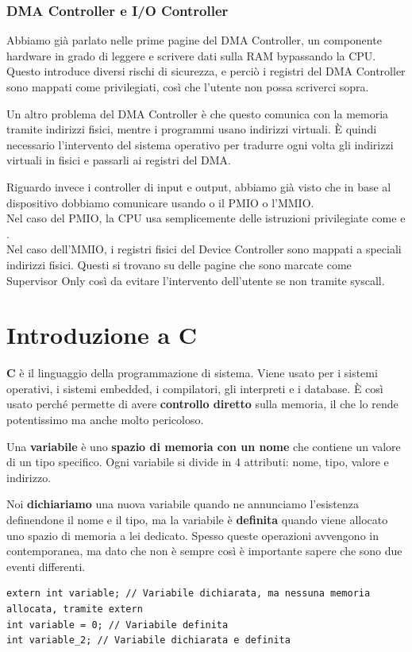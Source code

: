 \documentclass[11pt, a4paper, titlepage, oneside]{scrbook}
\begin{document}
\subsubsection*{DMA Controller e I/O Controller}

Abbiamo già parlato nelle prime pagine del DMA Controller, un componente hardware in grado di leggere e scrivere dati sulla RAM bypassando la CPU. Questo introduce diversi rischi di sicurezza, e perciò i registri del DMA Controller sono mappati come privilegiati, così che l'utente non possa scriverci sopra. 

Un altro problema del DMA Controller è che questo comunica con la memoria tramite indirizzi fisici, mentre i programmi usano indirizzi virtuali. È quindi necessario l'intervento del sistema operativo per tradurre ogni volta gli indirizzi virtuali in fisici e passarli ai registri del DMA.

Riguardo invece i controller di input e output, abbiamo già visto che in base al dispositivo dobbiamo comunicare usando o il PMIO o l'MMIO. \\
Nel caso del PMIO, la CPU usa semplicemente delle istruzioni privilegiate come  e . \\
Nel caso dell'MMIO, i registri fisici del Device Controller sono mappati a speciali indirizzi fisici. Questi si trovano su delle pagine che sono marcate come Supervisor Only così da evitare l'intervento dell'utente se non tramite syscall.

\section{Introduzione a C}

\begin{Definizione}[C]
\label{def-C}
\textbf{C} è il linguaggio della programmazione di sistema. Viene usato per i sistemi operativi, i sistemi embedded, i compilatori, gli interpreti e i database. È così usato perché permette di avere \textbf{controllo diretto} sulla memoria, il che lo rende potentissimo ma anche molto pericoloso.
\end{Definizione}

\begin{Definizione}[Variabile]
\label{def-variabile}
Una \textbf{variabile} è uno \textbf{spazio di memoria con un nome} che contiene un valore di un tipo specifico. Ogni variabile si divide in 4 attributi: nome, tipo, valore e indirizzo.
\end{Definizione}
Noi \textbf{dichiariamo} una nuova variabile quando ne annunciamo l'esistenza definendone il nome e il tipo, ma la variabile è \textbf{definita} quando viene allocato uno spazio di memoria a lei dedicato. Spesso queste operazioni avvengono in contemporanea, ma dato che non è sempre così è importante sapere che sono due eventi differenti.
\begin{lstlisting}[style=C]
extern int variable; // Variabile dichiarata, ma nessuna memoria allocata, tramite extern
int variable = 0; // Variabile definita
int variable_2; // Variabile dichiarata e definita
\end{lstlisting}
\end{document}
